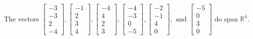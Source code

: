 \begin{exercise}
\begin{exerciseStatement}
  \end{exerciseStatement}
  \begin{exerciseAnswer}
   The vectors \(\left[\begin{array}{r}
-3 \\
-3 \\
2 \\
-4
\end{array}\right] , \left[\begin{array}{r}
-1 \\
2 \\
3 \\
4
\end{array}\right] , \left[\begin{array}{r}
-4 \\
4 \\
2 \\
3
\end{array}\right] , \left[\begin{array}{r}
-4 \\
-3 \\
0 \\
-5
\end{array}\right] , \left[\begin{array}{r}
-2 \\
-1 \\
4 \\
0
\end{array}\right] , \text{ and } \left[\begin{array}{r}
-5 \\
0 \\
3 \\
0
\end{array}\right]\) 
  	 do  
	span \(\mathbb{R}^4\).
  


  \end{exerciseAnswer}
\end{exercise}